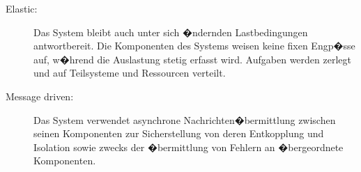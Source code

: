 \begin{description}
\item[Elastic:] Das System bleibt auch unter sich �ndernden Lastbedingungen antwortbereit. Die Komponenten des Systems weisen keine fixen Engp�sse auf, w�hrend die Auslastung stetig erfasst wird. Aufgaben werden zerlegt und auf Teilsysteme und Ressourcen verteilt. 

\item[Message driven:] Das System verwendet asynchrone Nachrichten�bermittlung zwischen seinen Komponenten zur Sicherstellung von deren Entkopplung und Isolation sowie zwecks der �bermittlung von Fehlern an �bergeordnete Komponenten. 


\end{description}


